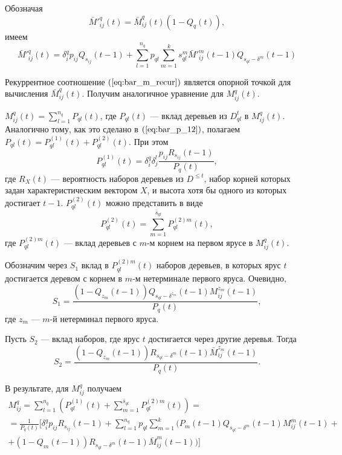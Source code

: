 \documentclass[11pt]{article}
\begin{document}
Обозначая
\begin{equation}
\label{eq:bar_m_ap}
    \bar{M}'^q_{ij}(t) = \bar{M}^q_{ij}(t) (1 - Q_q(t)),
\end{equation}
имеем
\begin{equation}
\label{eq:bar_m_recur}
    \bar{M}'^q_{ij}(t) = \delta^q_i p_{ij} Q_{s_{ij}}(t-1) + \sum_{l = 1}^{n_q} p_{ql} \sum_{m = 1}^k s_{ql}^m \bar{M}'^m_{ij}(t-1) Q_{s_{ql} - \delta^m}(t-1)
\end{equation}

Рекуррентное соотношение $(\ref{eq:bar_m_recur})$ является опорной точкой для вычисления $\bar{M}^q_{ij}(t)$. Получим аналогичное уравнение для $M^q_{ij}(t)$.

$M^q_{ij}(t) = \sum_{l = 1}^{n_q} P_{ql}(t)$, где $P_{ql}(t)$ --- вклад деревьев из $D_{ql}^t$ в $M^q_{ij}(t)$. Аналогично тому, как это сделано в $(\ref{eq:bar_p_12})$, полагаем $P_{ql}(t) = P^{(1)}_{ql}(t) + P^{(2)}_{ql}(t)$. При этом
\begin{equation}
    P^{(1)}_{ql}(t) = \delta^q_i \delta^l_j \frac{ p_{ij} R_{s_{ij}}(t-1) }{P_q(t)},
\end{equation}
где $R_X(t)$ --- вероятность наборов деревьев из $D^{\leqslant t}$, набор корней которых задан характеристическим вектором $X$, и высота хотя бы одного из которых достигает $t-1$. $P^{(2)}_{ql}(t)$ можно представить в виде
\begin{equation}
    P^{(2)}_{ql}(t) = \sum_{m = 1}^{\bar{s}_{ql}} P^{(2)m}_{ql}(t),
\end{equation}
где $P^{(2)m}_{ql}(t)$ --- вклад деревьев с $m$-м корнем на первом ярусе в $M^q_{ij}(t)$.

Обозначим через $S_1$ вклад в $P^{(2)m}_{ql}(t)$ наборов деревьев, в которых ярус $t$ достигается деревом с корнем в $m$-м нетерминале первого яруса. Очевидно,
\begin{equation}
    S_1 = \frac{ (1 - Q_{z_m}(t-1)) Q_{s_{ql} - \delta^{z_m}}(t-1) M^{z_m}_{ij}(t-1) }{ P_q(t) },
\end{equation}
где $z_m$ --- $m$-й нетерминал первого яруса.

Пусть $S_2$ --- вклад наборов, где ярус $t$ достигается через другие деревья. Тогда
\begin{equation}
    S_2 = \frac{ (1 - Q_{z_m}(t-1)) R_{s_{ql} - \delta^m}(t-1) \bar{M}^{z_m}_{ij}(t-1) }{ P_q(t) }.
\end{equation}

В результате, для $M^q_{ij}$ получаем
\begin{multline}
\label{eq:m_recur}
    M^q_{ij} = \sum_{l = 1}^{n_q} \left( P^{(1)}_{ql}(t) + \sum_{m = 1}^{\bar{s}_{ql}} P^{(2)m}_{ql}(t) \right) = \\
    = \frac{1}{P_q(t)} [ \delta^q_i p_{ij} R_{s_{ij}}(t-1) + \sum_{l = 1}^{n_q} p_{ql} \sum_{m = 1}^k (P_m(t-1) Q_{s_{ql} - \delta^m}(t-1) M^m_{ij}(t-1) + \\
    + (1 - Q_m(t-1)) R_{s_{ql} - \delta^m}(t-1) \bar{M}^m_{ij}(t-1)) ]
\end{multline}
\end{document}
